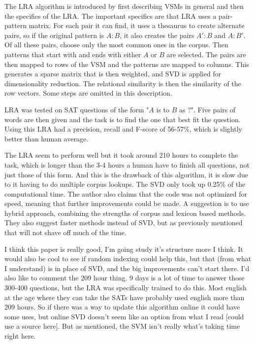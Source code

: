 \begin{review}
    The LRA algorithm is introduced by first describing VSMs in general and then the specifics of the LRA.
    The important specifics are that LRA uses a pair-pattern matrix.
    For each pair it can find, it uses a thesaurus to create alternate pairs, so if the original pattern is $A : B$, it also creates the pairs $A' : B$ and $A : B'$.
    Of all these pairs, choose only the most common ones in the corpus.
    Then patterns that start with and ends with either $A$ or $B$ are selected.
    The pairs are then mapped to rows of the VSM and the patterns are mapped to columns.
    This generates a sparse matrix that is then weighted, and SVD is applied for dimensionality reduction.
    The relational similarity is then the similarity of the row vectors.
    Some steps are omitted in this description.
    
    LRA was tested on SAT questions of the form "$A$ is to $B$ as ?".
    Five pairs of words are then given and the task is to find the one that best fit the question.
    Using this LRA had a precision, recall and F-score of 56-57\%, which is slightly better than human average.
    
    The LRA seem to perform well but it took around 210 hours to complete the task, which is longer than the 3-4 hours a human have to finish all questions, not just those of this form.
    And this is the drawback of this algorithm, it is slow due to it having to do multiple corpus lookups.
    The SVD only took up 0.25\% of the computational time.
    The author also claims that the code was not optimized for speed, meaning that further improvements could be made.
    A suggestion is to use hybrid approach, combining the strengths of corpus and lexicon based methods.
    They also suggest faster methods instead of SVD, but as previously mentioned that will not shave off much of the time.
    
    I think this paper is really good, I'm going study it's structure more I think.
    It would also be cool to see if random indexing could help this, but that (from what I understand) is in place of SVD, and the big improvements can't start there.
    I'd also like to comment the 209 hour thing.
    9 days is a lot of time to answer those 300-400 questions, but the LRA was specifically trained to do this.
    Most english at the age where they can take the SATs have probably used english more than 209 hours.
    So if there was a way to update this algorithm online it could have some uses, but online SVD doesn't seem like an option from what I read [could use a source here].
    But as mentioned, the SVM isn't really what's taking time right here.
    
\end{review}
